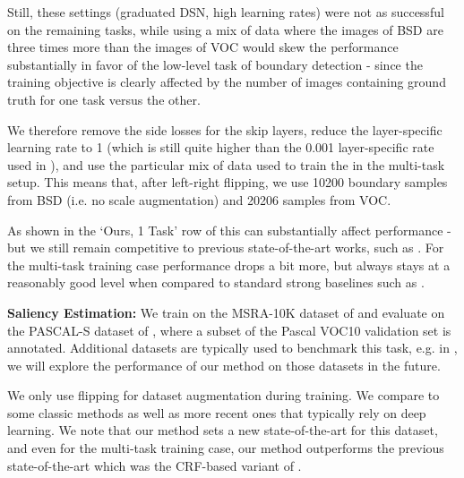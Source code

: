 \documentclass[10pt,twocolumn,letterpaper]{article}
\begin{document}
 Still, these settings (graduated DSN, high learning rates) were not as successful on the remaining tasks, while using a mix of data where the images of BSD are three times more than the images of VOC would skew the performance substantially in favor of the low-level task of boundary detection - since the training objective is clearly affected by the number of images containing ground truth for one task versus the other.
 
 We therefore remove the side losses for the skip layers,  reduce the layer-specific learning rate to 1 (which is still quite higher than the 0.001 layer-specific rate used in \cite{hed,iclr16}), and use the particular mix of data used to train the \ubernet in the multi-task setup. This means that, after left-right flipping, we use 10200 boundary samples from BSD (i.e. no scale augmentation) and 20206 samples from VOC. 
 
 As shown in the `Ours, 1 Task' row of 
  this can substantially affect performance  - but we still  remain competitive to previous state-of-the-art works, such as \cite{hed}. For the multi-task training case performance drops a bit more, but always stays at a reasonably good level when compared to standard strong baselines such as \cite{hed}.  
 
 
 \textbf{Saliency Estimation:} We train  on the MSRA-10K dataset of \cite{WangLLLS15} and evaluate on the PASCAL-S dataset of \cite{LiHKRY14}, where a subset of the Pascal VOC10 validation set is annotated. Additional datasets are typically used to benchmark this task, e.g. in \cite{saliencycvpr16}, we will explore the performance of our method on those datasets in the future.
 
 We only use flipping for dataset augmentation during training. We compare to some classic methods \cite{PerazziKPH12,msra,JiangLYP13} as well as more recent ones \cite{QinLXW15,WangLRY15,ZhaoOLW15,saliencycvpr16} that typically rely on deep learning. We note that our method sets a new state-of-the-art for this dataset, and even for the multi-task training case, our method 
 outperforms the previous state-of-the-art which was the CRF-based variant of \cite{saliencycvpr16}.  
 
\end{document}
